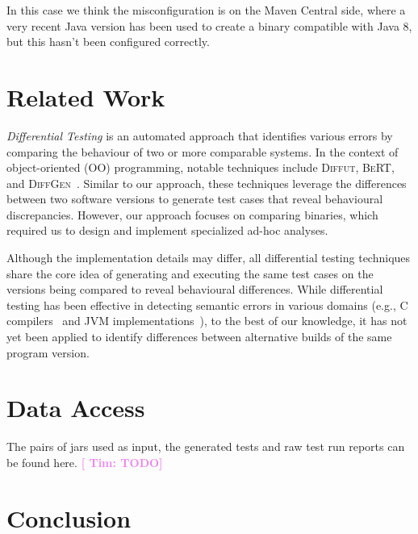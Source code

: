 \documentclass[conference]{IEEEtran}
\newcommand{\tim}[1]{\textbf{\textcolor{violet}{[ \ding{46}Tim: #1]}}}
\begin{document}
In this case we think the misconfiguration is on the Maven Central side, where a very recent Java version has been used to create a binary compatible with Java 8, but this hasn't been configured correctly.





\section{Related Work}
\label{sec:relatedwork}

\emph{Differential Testing}\cite{difftesting} is an automated approach that identifies various errors by comparing the behaviour of two or more comparable systems\cite{xie2007towards,jin10:automated,diffgen}. In the context of object-oriented (OO) programming, notable techniques include \textsc{Diffut}\cite{xie2007towards}, \textsc{BeRT}\cite{jin10:automated}, and \textsc{DiffGen}~\cite{diffgen}. Similar to our approach, these techniques leverage the differences between two software versions to generate test cases that reveal behavioural discrepancies. However, our approach focuses on comparing binaries, which required us to design and implement specialized ad-hoc analyses.

Although the implementation details may differ, all differential testing techniques share the core idea of generating and executing the same test cases on the versions being compared to reveal behavioural differences. %
While differential testing has been effective in detecting semantic errors in various domains (e.g., C compilers~\cite{Yang:compiler:pldi:2011} and JVM implementations~\cite{Chen:jvmdiff:pldi:2016}), to the best of our knowledge, it has not yet been applied to identify differences between alternative builds of the same program version.


\section{Data Access}
\label{sec:dataaccess}

The pairs of jars used as input, the generated tests and raw test run reports can be found here. \tim{TODO} 


\section{Conclusion}
\label{sec:conclusion}
\end{document}
